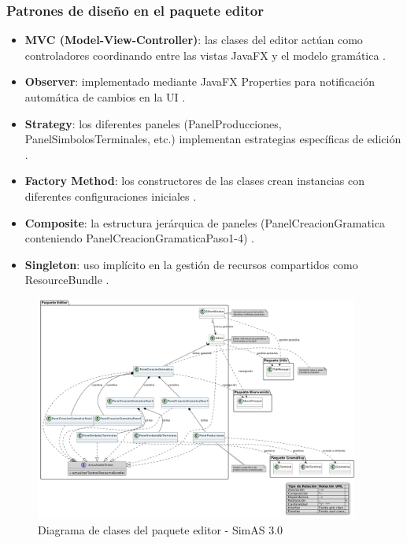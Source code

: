 \subsubsection{Patrones de diseño en el paquete editor}

\begin{itemize}
    \item \textbf{MVC (Model-View-Controller)}: las clases del editor actúan como controladores coordinando entre las vistas JavaFX y el modelo gramática \cite{burbeck1992applications}.
    \item \textbf{Observer}: implementado mediante JavaFX Properties para notificación automática de cambios en la UI \cite{gamma1995design}.
    \item \textbf{Strategy}: los diferentes paneles (PanelProducciones, PanelSimbolosTerminales, etc.) implementan estrategias específicas de edición \cite{gamma1995design}.
    \item \textbf{Factory Method}: los constructores de las clases crean instancias con diferentes configuraciones iniciales \cite{gamma1995design}.
    \item \textbf{Composite}: la estructura jerárquica de paneles (PanelCreacionGramatica conteniendo PanelCreacionGramaticaPaso1-4) \cite{gamma1995design}.
    \item \textbf{Singleton}: uso implícito en la gestión de recursos compartidos como ResourceBundle \cite{gamma1995design}.
\end{itemize}

\begin{figure}[p]
    \centering
    \includegraphics[angle=90,width=0.95\textwidth]{figuras/Cap9/diagrama_editor.png}
    \caption{Diagrama de clases del paquete editor - SimAS 3.0}
    \label{fig:diagrama_editor}
\end{figure}

